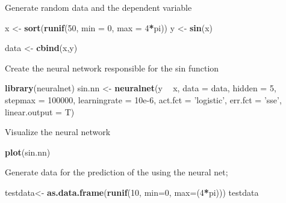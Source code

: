 \documentclass[]{article}
\newenvironment{Shaded}{\begin{snugshade}}{\end{snugshade}}
\newcommand{\DataTypeTok}[1]{\textcolor[rgb]{0.13,0.29,0.53}{#1}}
\newcommand{\DecValTok}[1]{\textcolor[rgb]{0.00,0.00,0.81}{#1}}
\newcommand{\FloatTok}[1]{\textcolor[rgb]{0.00,0.00,0.81}{#1}}
\newcommand{\KeywordTok}[1]{\textcolor[rgb]{0.13,0.29,0.53}{\textbf{#1}}}
\newcommand{\NormalTok}[1]{#1}
\newcommand{\OperatorTok}[1]{\textcolor[rgb]{0.81,0.36,0.00}{\textbf{#1}}}
\newcommand{\StringTok}[1]{\textcolor[rgb]{0.31,0.60,0.02}{#1}}
\begin{document}
Generate random data and the dependent variable

\begin{Shaded}
\begin{Highlighting}[]
\NormalTok{x <-}\StringTok{ }\KeywordTok{sort}\NormalTok{(}\KeywordTok{runif}\NormalTok{(}\DecValTok{50}\NormalTok{, }\DataTypeTok{min =} \DecValTok{0}\NormalTok{, }\DataTypeTok{max =} \DecValTok{4}\OperatorTok{*}\NormalTok{pi))}
\NormalTok{y <-}\StringTok{ }\KeywordTok{sin}\NormalTok{(x)}

\NormalTok{data <-}\StringTok{ }\KeywordTok{cbind}\NormalTok{(x,y)}
\end{Highlighting}
\end{Shaded}

Create the neural network responsible for the sin function

\begin{Shaded}
\begin{Highlighting}[]
\KeywordTok{library}\NormalTok{(neuralnet)}
\NormalTok{sin.nn <-}\StringTok{ }\KeywordTok{neuralnet}\NormalTok{(y }\OperatorTok{~}\StringTok{ }\NormalTok{x, }\DataTypeTok{data =}\NormalTok{ data, }\DataTypeTok{hidden =} \DecValTok{5}\NormalTok{, }\DataTypeTok{stepmax =} \DecValTok{100000}\NormalTok{, }\DataTypeTok{learningrate =} \FloatTok{10e-6}\NormalTok{,  }
                    \DataTypeTok{act.fct =} \StringTok{'logistic'}\NormalTok{, }\DataTypeTok{err.fct =} \StringTok{'sse'}\NormalTok{, }\DataTypeTok{linear.output =}\NormalTok{ T)}
\end{Highlighting}
\end{Shaded}

Visualize the neural network

\begin{Shaded}
\begin{Highlighting}[]
\KeywordTok{plot}\NormalTok{(sin.nn)}
\end{Highlighting}
\end{Shaded}

Generate data for the prediction of the using the neural net;

\begin{Shaded}
\begin{Highlighting}[]
\NormalTok{testdata<-}\StringTok{ }\KeywordTok{as.data.frame}\NormalTok{(}\KeywordTok{runif}\NormalTok{(}\DecValTok{10}\NormalTok{, }\DataTypeTok{min=}\DecValTok{0}\NormalTok{, }\DataTypeTok{max=}\NormalTok{(}\DecValTok{4}\OperatorTok{*}\NormalTok{pi)))}
\NormalTok{testdata}
\end{Highlighting}
\end{Shaded}
\end{document}
